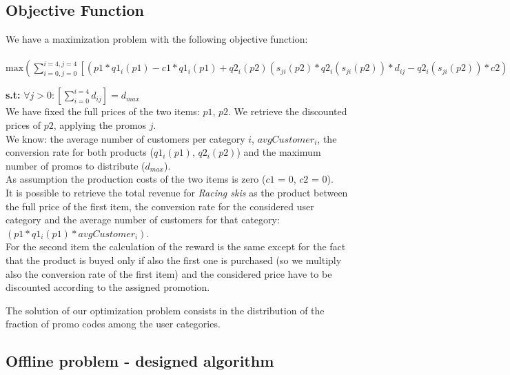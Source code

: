 \subsection*{Objective Function}
We have a maximization problem with the following objective function:\\
\\
$\textrm {max} ( \sum \limits _{i = 0, j = 0} ^{i = 4, j = 4}[(p1*q1_i(p1) - c1*q1_i(p1) + q2_i(p2)(s_{ji}(p2)*q2_i(s_{ji}(p2))*d_{ij} -  q2_i(s_{ji}(p2))*c2))*avgCustomer_i])$

\textbf{s.t:} $ \forall j>0 : [\sum \limits _{i = 0} ^{i = 4} d_{ij}] = d_{max} $
\\
We have fixed the full prices of the two items: $p1$, $p2$. We retrieve the discounted prices of $p2$, applying the promos $j$. \\
We know: the average number of customers per category $i$, $avgCustomer_i$, the conversion rate for both products ($q1_i(p1)$, $q2_i(p2)$) and the maximum number of promos to distribute ($d_{max}$).\\
As assumption the production costs of the two items is zero ($c1$ = 0, $c2$ = 0).\\
It is possible to retrieve the total revenue for \textit{Racing skis} as the product between the full price of the first item, the conversion rate for the considered user category and the average number of customers for that category:
$(p1 * q1_i(p1) * avgCustomer_i)$.\\
For the second item the calculation of the reward is the same except for the fact that the product is buyed only if also the first one is purchased (so we multiply also the conversion rate of the first item) and the considered price have to be discounted according to the assigned promotion. 

The solution of our optimization problem consists in the distribution of the fraction of promo codes among the user categories.

\subsection*{Offline problem - designed algorithm}

